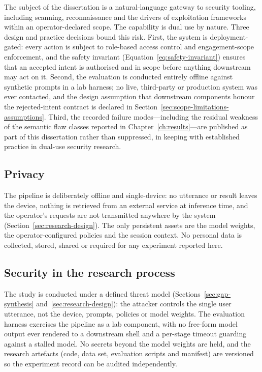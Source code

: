 The subject of the dissertation is a natural-language gateway to security
tooling, including scanning, reconnaissance and the drivers of exploitation
frameworks within an operator-declared scope. The capability is dual use by
nature. Three design and practice decisions bound this risk. First, the system
is deployment-gated: every action is subject to role-based access control and
engagement-scope enforcement, and the safety invariant
(Equation~\ref{eq:safety-invariant}) ensures that an accepted intent is
authorised and in scope before anything downstream may act on it. Second, the
evaluation is conducted entirely offline against synthetic prompts in a lab
harness; no live, third-party or production system was ever contacted, and the
design assumption that downstream components honour the rejected-intent contract
is declared in Section~\ref{sec:scope-limitations-assumptions}. Third, the
recorded failure modes---including the residual weakness of the semantic flaw
classes reported in Chapter~\ref{ch:results}---are published as part of this
dissertation rather than suppressed, in keeping with established practice in
dual-use security research.

\subsection*{Privacy}

The pipeline is deliberately offline and single-device: no utterance or result
leaves the device, nothing is retrieved from an external service at inference
time, and the operator's requests are not transmitted anywhere by the system
(Section~\ref{sec:research-design}). The only persistent assets are the model
weights, the operator-configured policies and the session context. No personal
data is collected, stored, shared or required for any experiment reported here.

\subsection*{Security in the research process}

The study is conducted under a defined threat model (Sections~\ref{sec:gap-synthesis}
and~\ref{sec:research-design}): the attacker controls the single user utterance,
not the device, prompts, policies or model weights. The evaluation harness
exercises the pipeline as a lab component, with no free-form model output ever
rendered to a downstream shell and a per-stage timeout guarding against a
stalled model. No secrets beyond the model weights are held, and the research
artefacts (code, data set, evaluation scripts and manifest) are versioned so the
experiment record can be audited independently.

